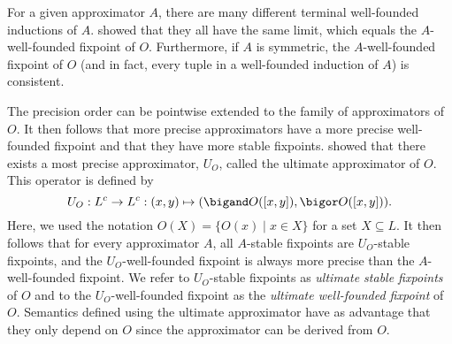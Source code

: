 For a given approximator $A$, there are many different terminal well-founded inductions of $A$.
\cite{lpnmr/DeneckerV07}  showed that they all have the same limit, which equals the $A$-well-founded fixpoint of $O$. Furthermore, if $A$ is symmetric, the $A$-well-founded fixpoint of $O$ (and in fact, every tuple in a well-founded induction of $A$) is consistent. 

The precision order can be pointwise extended to the family of approximators of $O$. It then follows that more precise approximators have a more precise well-founded fixpoint and that they have more stable fixpoints. 
\cite{DeneckerMT04} showed that there exists a most precise approximator, $U_O$, called the ultimate approximator of $O$. 
This operator is defined by \[U_O: L^c\to L^c: (x,y)\mapsto (\bigand O([x,y]), \bigor O([x,y])).\]
Here, we used the notation $O(X) = \{O(x)\mid x\in X\}$ for a set $X\subseteq L$.
 It then follows that for every
approximator $A$, all  $A$-stable fixpoints are $U_O$-stable fixpoints, and  the $U_O$-well-founded fixpoint is always more precise than the $A$-well-founded fixpoint.  
We refer to $U_O$-stable fixpoints as \emph{ultimate stable fixpoints} of $O$ and to the $U_O$-well-founded fixpoint as the \emph{ultimate well-founded fixpoint} of $O$.
Semantics defined using the ultimate approximator have as advantage that they only depend on $O$ since the approximator can be derived from $O$.
